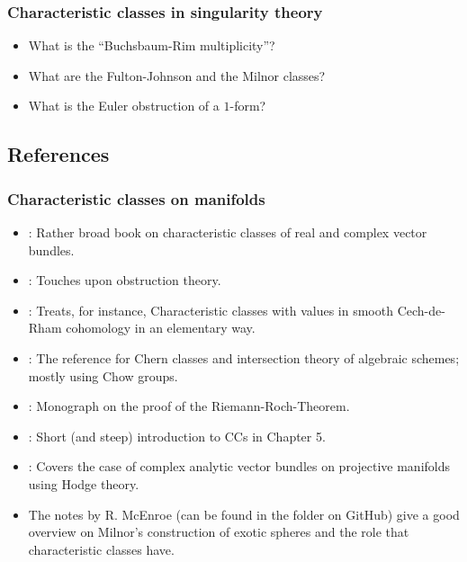 \documentclass[a4paper]{article}
\begin{document}
\subsubsection*{Characteristic classes in singularity theory}
\begin{itemize}
  \item What is the ``Buchsbaum-Rim multiplicity''? 
  \item What are the Fulton-Johnson and the Milnor classes?
  \item What is the Euler obstruction of a $1$-form? 
\end{itemize}

\subsection*{References} 
\subsubsection*{Characteristic classes on manifolds}
\begin{itemize}
  \item \cite{MilnorStasheff74}: Rather broad book on characteristic classes of real and 
    complex vector bundles.
  \item \cite{Husemoeller94}: Touches upon obstruction theory. 
  \item \cite{BottTu82}: Treats, for instance, Characteristic classes with values in smooth Cech-de-Rham 
    cohomology in an elementary way.
  \item \cite{Fulton98}: The reference for Chern classes and intersection theory 
    of algebraic schemes; mostly using Chow groups.
  \item \cite{Hirzebruch66}: Monograph on the proof of the Riemann-Roch-Theorem.
  \item \cite{Stong68}: Short (and steep) introduction to CCs in Chapter 5.
  \item \cite{Atiyah56}: Covers the case of complex analytic vector bundles on 
    projective manifolds using Hodge theory.
  \item The notes by R. McEnroe (can be found in the folder on GitHub) give a good overview on
	  Milnor's construction of exotic spheres and the role that characteristic classes have.
\end{itemize}
\end{document}
